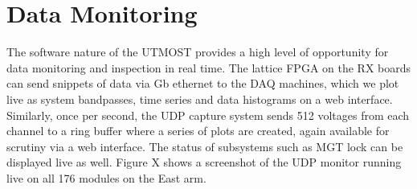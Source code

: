\section{Data Monitoring }

The software nature of the UTMOST provides a high level of opportunity for data monitoring and inspection in real time. The lattice FPGA on the RX boards can send snippets of data via Gb ethernet to the DAQ machines, which we plot live as system bandpasses, time series and data histograms on a web interface. Similarly, once per second, the UDP capture system sends 512 voltages from each channel to a ring buffer where a series of plots are created, again available for scrutiny via a web interface. The status of subsystems such as MGT lock can be displayed live as well. Figure X shows a screenshot of the UDP monitor running live on all 176 modules on the East arm.

  
  